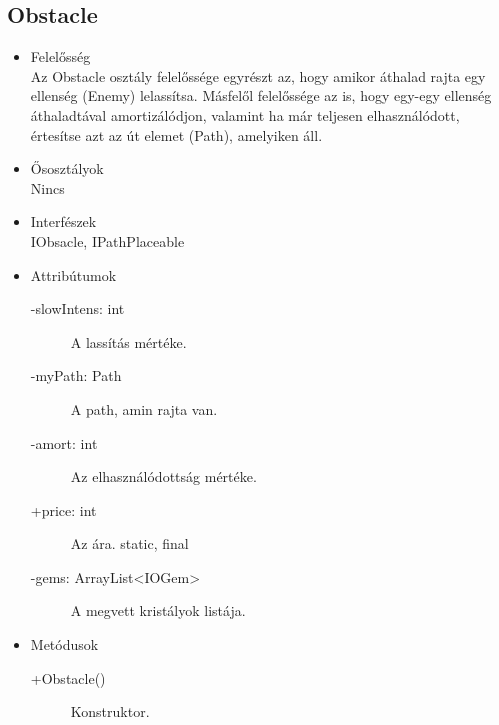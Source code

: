 \subsection{Obstacle}
\begin{itemize}
\item Felelősség\\
Az Obstacle osztály felelőssége egyrészt az, hogy amikor áthalad rajta egy ellenség (Enemy) lelassítsa. Másfelől felelőssége az is, hogy egy-egy ellenség  áthaladtával amortizálódjon, valamint ha már teljesen elhasználódott, értesítse azt az út elemet (Path), amelyiken áll.
\item Ősosztályok\\
Nincs
\item Interfészek\\
IObsacle, IPathPlaceable
\item Attribútumok
	\begin{description}
	\item[-slowIntens: int] A lassítás mértéke. 
\item[-myPath: Path] A path, amin rajta van. 
\item[-amort: int] Az elhasználódottság mértéke. 
\item[+price: int] Az ára. static, final
\item[-gems: ArrayList<IOGem>] A megvett kristályok listája. 


	\end{description}
\item Metódusok
	\begin{description}
		
		\item[+Obstacle()] Konstruktor. 
		
		
	\end{description}
\end{itemize}
